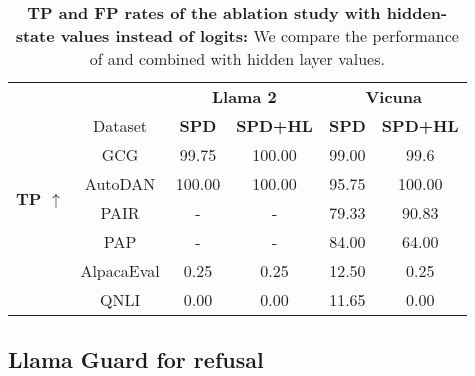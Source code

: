 \begin{table}[h!]
\caption{\textbf{TP and FP rates of the ablation study with hidden-state values instead of logits:} We compare the performance of \methodname{} and \methodname{} combined with hidden layer values.}
\label{table:hl}
\setlength{\tabcolsep}{6pt}
\begin{center}
\begin{small}
\begin{tabular}{ c c c  c c c }
\toprule
 \rowcolor{black!10}&& \multicolumn{2}{c}{\textbf{Llama 2}} & \multicolumn{2}{c}{\textbf{Vicuna}}\\
   \rowcolor{black!10}& Dataset & \textbf{SPD} & \textbf{SPD+HL} & \textbf{SPD} & \textbf{SPD+HL} \\
    \midrule 
\multirow{4}{*}{\textbf{TP $\uparrow$}}&
{GCG}    & 99.75              & 100.00                                      & 99.00               & 99.6                                      \\
    &{AutoDAN}   & 100.00                & 100.00                                      & 95.75               & 100.00                                       \\
    &{PAIR}   & -                  & -                                        & 79.33               & 90.83                                     \\
    &{PAP}    & -                  & -                                        & 84.00               & 64.00                                        \\
\midrule
\rowcolor{black!10} & AlpacaEval&0.25               & 0.25                                     & 12.50               & 0.25                                      \\
\rowcolor{black!10}\multirow{-2}{*}{\textbf{FP $\downarrow$}}&QNLI& 0.00                  & 0.00                                        & 11.65               & 0.00 \\
    \bottomrule

\end{tabular}
\end{small}
\end{center}
\vskip -0.15in
\end{table}



\subsection{Llama Guard for refusal}
\label{app:guard}

